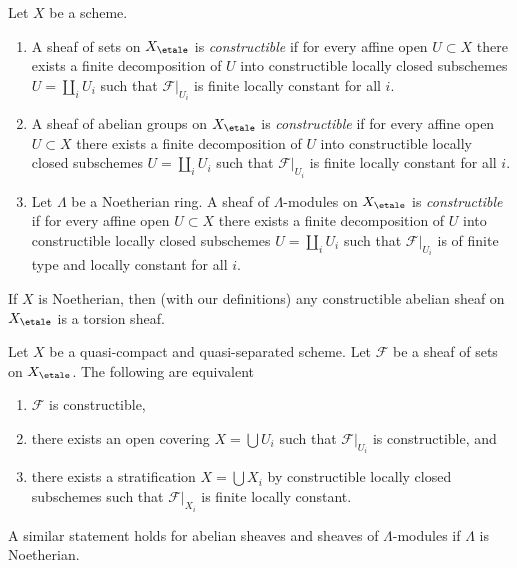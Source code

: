 \begin{definition}
\label{definition-constructible}
Let $X$ be a scheme.
\begin{enumerate}
\item A sheaf of sets on $X_\etale$ is {\it constructible}
if for every affine open $U \subset X$ there exists a finite decomposition
of $U$ into constructible locally closed subschemes $U = \coprod_i U_i$
such that $\mathcal{F}|_{U_i}$ is finite locally constant for all $i$.
\item A sheaf of abelian groups on $X_\etale$ is {\it constructible}
if for every affine open $U \subset X$ there exists a finite decomposition
of $U$ into constructible locally closed subschemes $U = \coprod_i U_i$
such that $\mathcal{F}|_{U_i}$ is finite locally constant for all $i$.
\item Let $\Lambda$ be a Noetherian ring. A sheaf of $\Lambda$-modules
on $X_\etale$ is {\it constructible} if for every affine open
$U \subset X$ there exists a finite decomposition
of $U$ into constructible locally closed subschemes
$U = \coprod_i U_i$ such that
$\mathcal{F}|_{U_i}$ is of finite type and locally constant for all $i$.
\end{enumerate}
\end{definition}

\begin{remark}
\label{remark-noetherian-constructible-torsion}
If $X$ is Noetherian, then (with our definitions)
any constructible abelian sheaf on $X_\etale$ is a torsion sheaf.
\end{remark}

\begin{lemma}
\label{lemma-constructible-quasi-compact-quasi-separated}
Let $X$ be a quasi-compact and quasi-separated scheme. Let $\mathcal{F}$
be a sheaf of sets on $X_\etale$. The following are equivalent
\begin{enumerate}
\item $\mathcal{F}$ is constructible,
\item there exists an open covering $X = \bigcup U_i$ such that
$\mathcal{F}|_{U_i}$ is constructible, and
\item there exists a stratification $X = \bigcup X_i$ by constructible
locally closed subschemes such that $\mathcal{F}|_{X_i}$ is finite
locally constant.
\end{enumerate}
A similar statement holds for abelian sheaves and sheaves of
$\Lambda$-modules if $\Lambda$ is Noetherian.
\end{lemma}

